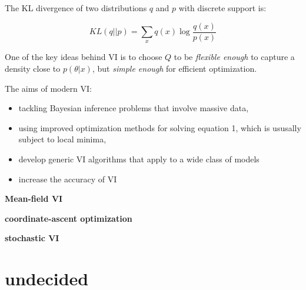 \documentclass[fontset=fandol,zihao=false,scheme=chinese,heading=true,UTF8]{ctexbook}
\providecommand{\tightlist}{%
  \setlength{\itemsep}{0pt}\setlength{\parskip}{0pt}}
\begin{document}
The KL divergence of two distributions \(q\) and \(p\) with discrete support is:

\[KL(q||p) = \sum_xq(x)\log \frac{q(x)}{p(x)}\]

One of the key ideas behind VI is to choose \(Q\) to be \emph{flexible enough} to capture a density close to \(p(\theta|x)\), but \emph{simple enough} for efficient optimization.

The aims of modern VI:

\begin{itemize}
\tightlist
\item
  tackling Bayesian inference problems that involve massive data,
\item
  using improved optimization methods for solving equation 1, which is ususally subject to local minima,
\item
  develop generic VI algorithms that apply to a wide class of models
\item
  increase the accuracy of VI
\end{itemize}

\textbf{Mean-field VI}

\textbf{coordinate-ascent optimization}

\textbf{stochastic VI}

\hypertarget{undecided}{%
\chapter{undecided}\label{undecided}}




\backmatter
\printindex
\end{document}
